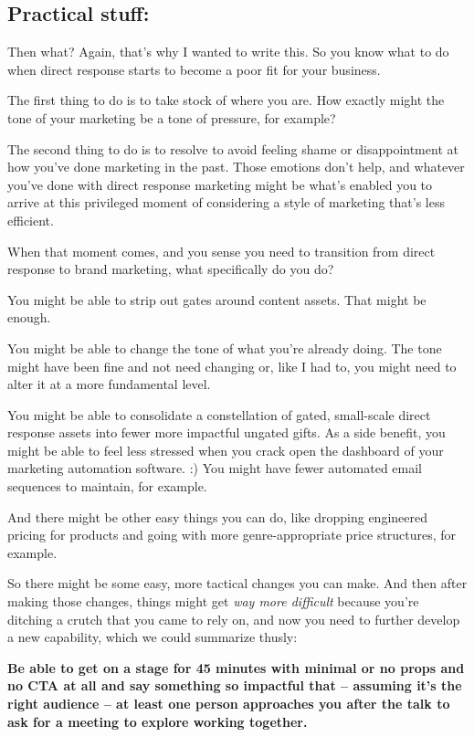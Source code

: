 \documentclass[13pt,]{tufte-handout}
\begin{document}
\hypertarget{practical-stuff}{%
\subsection{Practical stuff:}\label{practical-stuff}}

Then what? Again, that's why I wanted to write this. So you know what to
do when direct response starts to become a poor fit for your business.

The first thing to do is to take stock of where you are. How exactly
might the tone of your marketing be a tone of pressure, for example?

The second thing to do is to resolve to avoid feeling shame or
disappointment at how you've done marketing in the past. Those emotions
don't help, and whatever you've done with direct response marketing
might be what's enabled you to arrive at this privileged moment of
considering a style of marketing that's less efficient.

When that moment comes, and you sense you need to transition from direct
response to brand marketing, what specifically do you do?

You might be able to strip out gates around content assets. That might
be enough.

You might be able to change the tone of what you're already doing. The
tone might have been fine and not need changing or, like I had to, you
might need to alter it at a more fundamental level.

You might be able to consolidate a constellation of gated, small-scale
direct response assets into fewer more impactful ungated gifts. As a
side benefit, you might be able to feel less stressed when you crack
open the dashboard of your marketing automation software. :) You might
have fewer automated email sequences to maintain, for example.

And there might be other easy things you can do, like dropping
engineered pricing for products and going with more genre-appropriate
price structures, for example.

So there might be some easy, more tactical changes you can make. And
then after making those changes, things might get \emph{way more
difficult} because you're ditching a crutch that you came to rely on,
and now you need to further develop a new capability, which we could
summarize thusly:

\textbf{Be able to get on a stage for 45 minutes with minimal or no
props and no CTA at all and say something so impactful that -- assuming
it's the right audience -- at least one person approaches you after the
talk to ask for a meeting to explore working together.}
\end{document}
